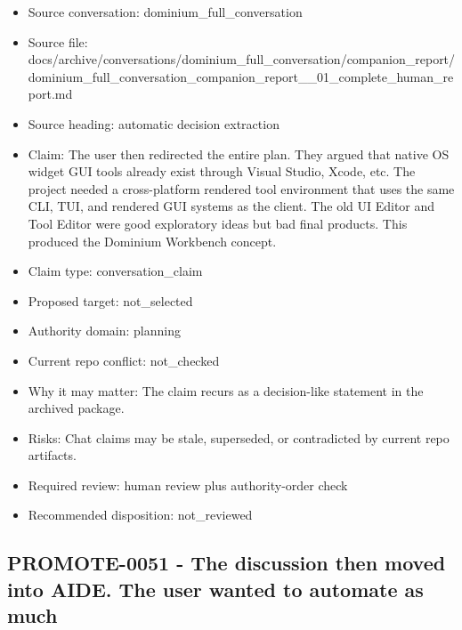 \documentclass[11pt,a4paper]{report}
\begin{document}
\begin{itemize}
\item Source conversation: dominium\_full\_conversation
\item Source file: docs/archive/conversations/dominium\_full\_conversation/companion\_report/dominium\_full\_conversation\_companion\_report\_\_01\_complete\_human\_report.md
\item Source heading: automatic decision extraction
\item Claim: The user then redirected the entire plan. They argued that native OS widget GUI tools already exist through Visual Studio, Xcode, etc. The project needed a cross-platform rendered tool environment that uses the same CLI, TUI, and rendered GUI systems as the client. The old UI Editor and Tool Editor were good exploratory ideas but bad final products. This produced the Dominium Workbench concept.
\item Claim type: conversation\_claim
\item Proposed target: not\_selected
\item Authority domain: planning
\item Current repo conflict: not\_checked
\item Why it may matter: The claim recurs as a decision-like statement in the archived package.
\item Risks: Chat claims may be stale, superseded, or contradicted by current repo artifacts.
\item Required review: human review plus authority-order check
\item Recommended disposition: not\_reviewed
\end{itemize}

\subsection{PROMOTE-0051 - The discussion then moved into AIDE. The user wanted to automate as much}
\end{document}
